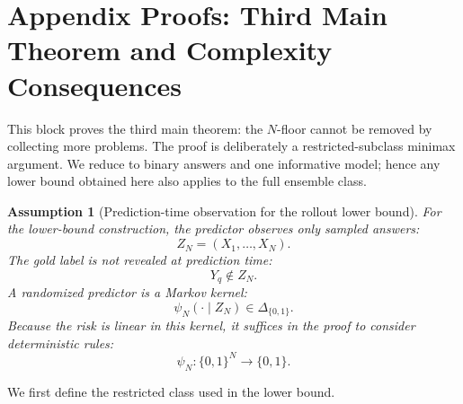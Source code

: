 \documentclass{article} %
\newtheorem{assumption}{Assumption}
\begin{document}
\section{Appendix Proofs: Third Main Theorem and Complexity Consequences}
\label{app:proofs-lb}

This block proves the third main theorem: the \(N\)-floor cannot be removed by
collecting more problems.  The proof is deliberately a restricted-subclass
minimax argument.  We reduce to binary answers and one informative model; hence
any lower bound obtained here also applies to the full ensemble class.

\begin{assumption}[Prediction-time observation for the rollout lower bound]
\label{ass:A6}
For the lower-bound construction, the predictor observes only sampled answers:
\begin{equation}
\label{eq:app3-observation}
Z_N=(X_1,\ldots,X_N).
\end{equation}
The gold label is not revealed at prediction time:
\begin{equation}
\label{eq:app3-hidden-gold}
Y_q\notin Z_N .
\end{equation}
A randomized predictor is a Markov kernel:
\begin{equation}
\label{eq:app3-kernel}
\psi_N(\cdot\mid Z_N)\in\Delta_{\{0,1\}} .
\end{equation}
Because the risk is linear in this kernel, it suffices in the proof to consider
deterministic rules:
\begin{equation}
\label{eq:app3-deterministic}
\psi_N:\{0,1\}^N\to\{0,1\}.
\end{equation}
\end{assumption}

We first define the restricted class used in the lower bound.
\end{document}
